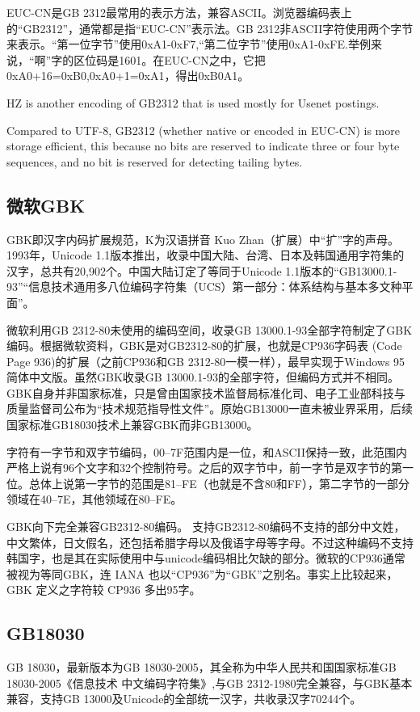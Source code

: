 EUC-CN是GB 2312最常用的表示方法，兼容ASCII。浏览器编码表上的“GB2312”，通常都是指“EUC-CN”表示法。GB 2312非ASCII字符使用两个字节来表示。“第一位字节”使用0xA1-0xF7,“第二位字节”使用0xA1-0xFE.举例来说，“啊”字的区位码是1601。在EUC-CN之中，它把0xA0+16=0xB0,0xA0+1=0xA1，得出0xB0A1。

HZ is another encoding of GB2312 that is used mostly for Usenet postings.

Compared to UTF-8, GB2312 (whether native or encoded in EUC-CN) is more storage efficient, this because no bits are reserved to indicate three or four byte sequences, and no bit is reserved for detecting tailing bytes.

\subsection{微软GBK}
GBK即汉字内码扩展规范，K为汉语拼音 Kuo Zhan（扩展）中“扩”字的声母。
1993年，Unicode 1.1版本推出，收录中国大陆、台湾、日本及韩国通用字符集的汉字，总共有20,902个。中国大陆订定了等同于Unicode 1.1版本的“GB13000.1-93”“信息技术通用多八位编码字符集（UCS）第一部分：体系结构与基本多文种平面”。

微软利用GB 2312-80未使用的编码空间，收录GB 13000.1-93全部字符制定了GBK编码。根据微软资料，GBK是对GB2312-80的扩展，也就是CP936字码表 (Code Page 936)的扩展（之前CP936和GB 2312-80一模一样），最早实现于Windows 95简体中文版。虽然GBK收录GB 13000.1-93的全部字符，但编码方式并不相同。GBK自身并非国家标准，只是曾由国家技术监督局标准化司、电子工业部科技与质量监督司公布为“技术规范指导性文件”。原始GB13000一直未被业界采用，后续国家标准GB18030技术上兼容GBK而非GB13000。

字符有一字节和双字节编码，00–7F范围内是一位，和ASCII保持一致，此范围内严格上说有96个文字和32个控制符号。之后的双字节中，前一字节是双字节的第一位。总体上说第一字节的范围是81–FE（也就是不含80和FF），第二字节的一部分领域在40–7E，其他领域在80–FE。

GBK向下完全兼容GB2312-80编码。 支持GB2312-80编码不支持的部分中文姓，中文繁体，日文假名，还包括希腊字母以及俄语字母等字母。不过这种编码不支持韩国字，也是其在实际使用中与unicode编码相比欠缺的部分。微软的CP936通常被视为等同GBK，连 IANA 也以“CP936”为“GBK”之别名。事实上比较起来， GBK 定义之字符较 CP936 多出95字。

\subsection{GB18030}
GB 18030，最新版本为GB 18030-2005，其全称为中华人民共和国国家标准GB 18030-2005《信息技术 中文编码字符集》,与GB 2312-1980完全兼容，与GBK基本兼容，支持GB 13000及Unicode的全部统一汉字，共收录汉字70244个。

